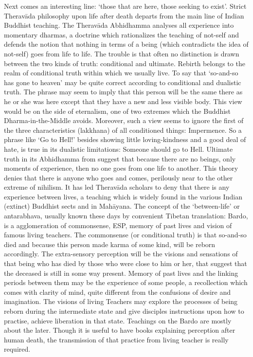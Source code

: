    Next comes an interesting line: `those that are here, those seeking to exist'. Strict Therav\=ada philosophy upon life after death departs from the main line of Indian Buddhist teaching. The Therav\=ada Abhidhamma analyses all experience into momentary dharmas, a doctrine which rationalizes the teaching of not-self and defends the notion that nothing in terms of a being (which contradicts the idea of not-self) goes from life to life. The trouble is that often no distinction is drawn between the two kinds of truth: conditional and ultimate. Rebirth belongs to the realm of conditional truth within which we usually live. To say that `so-and-so has gone to heaven' may be quite correct according to conditional and dualistic truth. The phrase may seem to imply that this person will be the same there as he or she was here except that they have a new and less visible body. This view would be on the side of eternalism, one of two extremes which the Buddhist Dharma-in-the-Middle avoids. Moreover, such a view seems to ignore the first of the three characteristics (lakkhana) of all conditioned things: Impermence. So a phrase like `Go to Hell!' besides showing little loving-kindness and a good deal of hate, is true in its dualistic limitations: Someone should go to Hell.
   Ultimate truth in its Abhidhamma from suggest that because there are no beings, only moments of experience, then no one goes from one life to another. This theory denies that there is anyone who goes and comes, perilously near to the other extreme of nihilism. It has led Therav\=ada scholars to deny that there is any experience between lives, a teaching which is widely found in the various Indian (extinct) Buddhist sects and in Mah\=ayana.
   The concept of the `between-life' or antarabhava, usually known these days by convenient Tibetan translation: Bardo, is a agglomeration of commonsense, ESP, memory of past lives and vision of famous living teachers. The commonsense (or conditional truth) is that so-and-so died and because this person made karma  of some kind, will be reborn accordingly. The extra-sensory perception will be the visions and sensations of that being who has died by those who were close to him or her, that suggest that the deceased is still in some way present. Memory of past lives and the linking periods between them may be the experience of some people, a recollection which comes with clarity of mind, quite different from the confusions of desire and imagination.
   The visions of living Teachers may explore the processes of being reborn during the intermediate state and give disciples instructions upon how to practise, achieve liberation in that state. Teachings on the Bardo are mostly about the later. Though it is useful to have books explaining perception after human death, the transmission of that practice from living teacher is really required.
